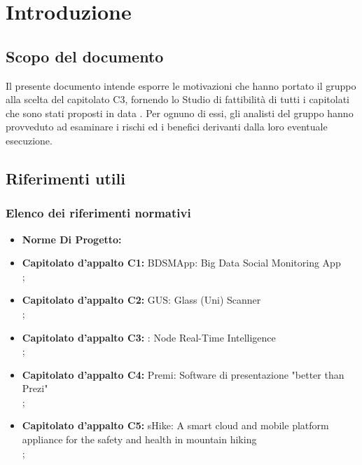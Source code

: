 \section{Introduzione}

	\subsection{Scopo del documento}
		Il presente documento intende esporre le motivazioni che hanno portato il gruppo alla scelta del capitolato C3, fornendo lo Studio di fattibilità di tutti i capitolati che sono stati proposti in data . Per ognuno di essi, gli analisti del gruppo hanno provveduto ad esaminare i rischi ed i benefici derivanti dalla loro eventuale esecuzione.
	
	


	\subsection{Riferimenti utili}

		\subsubsection{Elenco dei riferimenti normativi}
			\begin{itemize}
				\item \textbf{Norme Di Progetto:} 
				\item \textbf{Capitolato d'appalto C1:} BDSMApp: Big Data Social Monitoring App\\
					;
				\item \textbf{Capitolato d'appalto C2:} GUS: Glass (Uni) Scanner\\
					;
				\item \textbf{Capitolato d'appalto C3:} \projectname: Node Real-Time Intelligence\\
					;
				\item \textbf{Capitolato d'appalto C4:} Premi: Software di presentazione "better than Prezi"\\
					;
				\item \textbf{Capitolato d'appalto C5:} sHike: A smart cloud and mobile platform appliance for the safety and health in mountain hiking\\
					;
			\end{itemize}

